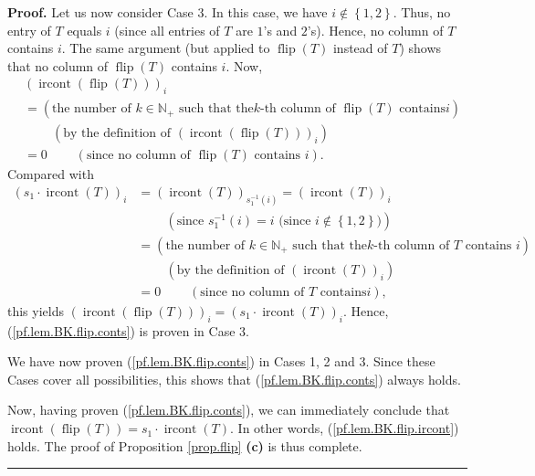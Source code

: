 \documentclass[numbers=enddot,12pt,final,onecolumn,notitlepage]{scrartcl}%
\theoremstyle{definition}
\newenvironment{proof}[1][Proof]{\noindent\textbf{#1.} }{\ \rule{0.5em}{0.5em}}
\newenvironment{verlong}{}{}
\begin{document}
\begin{verlong}
\begin{proof}
Let us now consider Case 3. In this case, we have $i\notin\left\{
1,2\right\}  $. Thus, no entry of $T$ equals $i$ (since all entries of $T$ are
$1$'s and $2$'s). Hence, no column of $T$ contains $i$. The same argument (but
applied to $\operatorname*{flip}\left(  T\right)  $ instead of $T$) shows that
no column of $\operatorname*{flip}\left(  T\right)  $ contains $i$. Now,%
\begin{align*}
&  \left(  \operatorname*{ircont}\left(  \operatorname*{flip}\left(  T\right)
\right)  \right)  _{i}\\
&  =\left(  \text{the number of }k\in\mathbb{N}_{+}\text{ such that the
}k\text{-th column of }\operatorname*{flip}\left(  T\right)  \text{ contains
}i\right) \\
&  \ \ \ \ \ \ \ \ \ \ \left(  \text{by the definition of }\left(
\operatorname*{ircont}\left(  \operatorname*{flip}\left(  T\right)  \right)
\right)  _{i}\right) \\
&  =0\ \ \ \ \ \ \ \ \ \ \left(  \text{since no column of }%
\operatorname*{flip}\left(  T\right)  \text{ contains }i\right)  .
\end{align*}
Compared with%
\begin{align*}
\left(  s_{1}\cdot\operatorname*{ircont}\left(  T\right)  \right)  _{i}  &
=\left(  \operatorname*{ircont}\left(  T\right)  \right)  _{s_{1}^{-1}\left(
i\right)  }=\left(  \operatorname*{ircont}\left(  T\right)  \right)  _{i}\\
&  \ \ \ \ \ \ \ \ \ \ \left(  \text{since }s_{1}^{-1}\left(  i\right)
=i\text{ (since }i\notin\left\{  1,2\right\}  \text{)}\right) \\
&  =\left(  \text{the number of }k\in\mathbb{N}_{+}\text{ such that the
}k\text{-th column of }T\text{ contains }i\right) \\
&  \ \ \ \ \ \ \ \ \ \ \left(  \text{by the definition of }\left(
\operatorname*{ircont}\left(  T\right)  \right)  _{i}\right) \\
&  =0\ \ \ \ \ \ \ \ \ \ \left(  \text{since no column of }T\text{ contains
}i\right)  ,
\end{align*}
this yields $\left(  \operatorname*{ircont}\left(  \operatorname*{flip}\left(
T\right)  \right)  \right)  _{i}=\left(  s_{1}\cdot\operatorname*{ircont}%
\left(  T\right)  \right)  _{i}$. Hence, (\ref{pf.lem.BK.flip.conts}) is
proven in Case 3.

We have now proven (\ref{pf.lem.BK.flip.conts}) in Cases 1, 2 and 3. Since
these Cases cover all possibilities, this shows that
(\ref{pf.lem.BK.flip.conts}) always holds.

Now, having proven (\ref{pf.lem.BK.flip.conts}), we can immediately conclude
that $\operatorname*{ircont}\left(  \operatorname*{flip}\left(  T\right)
\right)  =s_{1}\cdot\operatorname*{ircont}\left(  T\right)  $. In other words,
(\ref{pf.lem.BK.flip.ircont}) holds. The proof of Proposition \ref{prop.flip}
\textbf{(c)} is thus complete.
\end{proof}
\end{verlong}
\end{document}
